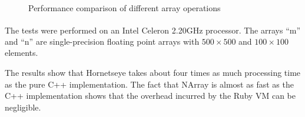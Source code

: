 \documentclass[12pt,a4paper,oneside,openright]{book}
\begin{document}
\begin{CJK}{UTF8}{}
\begin{figure}[htbp]
\begin{center}
    \caption{Performance comparison of different array operations\label{fig:performance}}
  \end{center}
\end{figure}
The tests were performed on an Intel\textsuperscript{\texttrademark} Celeron\textsuperscript{\texttrademark} 2.20GHz processor. The arrays ``m'' and ``n'' are single-precision floating point arrays with $500\times 500$ and $100\times 100$ elements.

The results show that Hornetseye takes about four times as much processing time as the pure C++ implementation. The fact that NArray is almost as fast as the C++ implementation shows that the overhead incurred by the Ruby \ac{VM} can be negligible.



\end{CJK}
\end{document}
